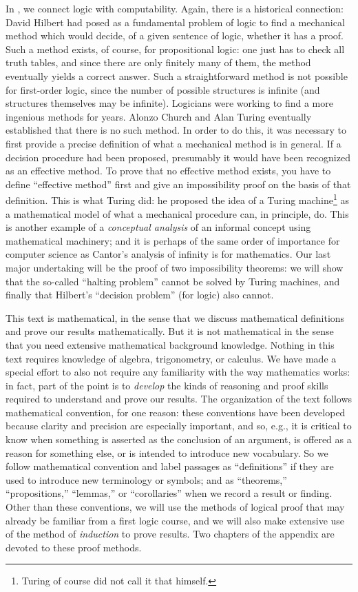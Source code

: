 In , we connect logic with computability. Again,
there is a historical connection: David Hilbert had posed as a
fundamental problem of logic to find a mechanical method which would
decide, of a given sentence of logic, whether it has a proof. Such a
method exists, of course, for propositional logic: one just has to
check all truth tables, and since there are only finitely many of
them, the method eventually yields a correct answer. Such a
straightforward method is not possible for first-order logic, since
the number of possible structures is infinite (and structures
themselves may be infinite). Logicians were working to find a more
ingenious methods for years. Alonzo Church and Alan Turing eventually
established that there is no such method. In order to do this, it was
necessary to first provide a precise definition of what a mechanical
method is in general. If a decision procedure had been proposed,
presumably it would have been recognized as an effective method. To
prove that no effective method exists, you have to define ``effective
method'' first and give an impossibility proof on the basis of that
definition. This is what Turing did: he proposed the idea of a Turing
machine\footnote{Turing of course did not call it that himself.} as a
mathematical model of what a mechanical procedure can, in principle,
do. This is another example of a \emph{conceptual analysis} of an
informal concept using mathematical machinery; and it is perhaps of
the same order of importance for computer science as Cantor's analysis
of infinity is for mathematics. Our last major undertaking will be the
proof of two impossibility theorems: we will show that the so-called
``halting problem'' cannot be solved by Turing machines, and finally
that Hilbert's ``decision problem'' (for logic) also cannot.

This text is mathematical, in the sense that we discuss mathematical
definitions and prove our results mathematically. But it is not
mathematical in the sense that you need extensive mathematical
background knowledge. Nothing in this text requires knowledge of
algebra, trigonometry, or calculus. We have made a special effort to
also not require any familiarity with the way mathematics works: in
fact, part of the point is to \emph{develop} the kinds of reasoning
and proof skills required to understand and prove our results. The
organization of the text follows mathematical convention, for one
reason: these conventions have been developed because clarity and
precision are especially important, and so, e.g., it is critical to
know when something is asserted as the conclusion of an argument, is
offered as a reason for something else, or is intended to introduce
new vocabulary. So we follow mathematical convention and label
passages as ``definitions'' if they are used to introduce new
terminology or symbols; and as ``theorems,'' ``propositions,''
``lemmas,'' or ``corollaries'' when we record a result or finding.
Other than these conventions, we will use the methods of logical proof
that may already be familiar from a first logic course, and we will
also make extensive use of the method of \emph{induction} to prove
results. Two chapters of the appendix are devoted to these proof
methods.

